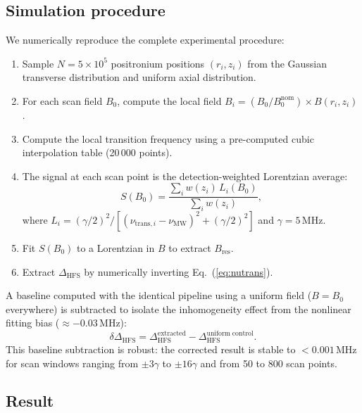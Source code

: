 \documentclass[twocolumn,pra,aps,superscriptaddress,floatfix,10pt]{revtex4-2}
\begin{document}
\subsection{Simulation procedure}

We numerically reproduce the complete experimental procedure:
\begin{enumerate}
  \item Sample $N = 5 \times 10^5$ positronium positions $(r_i, z_i)$ from the Gaussian transverse distribution and uniform axial distribution.
  \item For each scan field $B_0$, compute the local field $B_i = (B_0/B_0^\mathrm{nom}) \times B(r_i, z_i)$.
  \item Compute the local transition frequency using a pre-computed cubic interpolation table (20\,000 points).
  \item The signal at each scan point is the detection-weighted Lorentzian average:
  \begin{equation}
    S(B_0) = \frac{\sum_i w(z_i)\, L_i(B_0)}{\sum_i w(z_i)},
    \label{eq:signal}
  \end{equation}
  where $L_i = (\gamma/2)^2/[(\nu_{\mathrm{trans},i} - \nu_\mathrm{MW})^2 + (\gamma/2)^2]$ and $\gamma = 5$\,MHz.
  \item Fit $S(B_0)$ to a Lorentzian in $B$ to extract $B_\mathrm{res}$.
  \item Extract $\Delta_\mathrm{HFS}$ by numerically inverting Eq.~(\ref{eq:nutrans}).
\end{enumerate}

A baseline computed with the identical pipeline using a uniform field ($B = B_0$ everywhere) is subtracted to isolate the inhomogeneity effect from the nonlinear fitting bias ($\approx -0.03$\,MHz):
\begin{equation}
  \delta\Delta_\mathrm{HFS} = \Delta_\mathrm{HFS}^\mathrm{extracted} - \Delta_\mathrm{HFS}^\mathrm{uniform\;control}.
  \label{eq:shift}
\end{equation}
This baseline subtraction is robust: the corrected result is stable to $< 0.001$\,MHz for scan windows ranging from $\pm 3\gamma$ to $\pm 16\gamma$ and from 50 to 800 scan points.

\subsection{Result}
\end{document}
